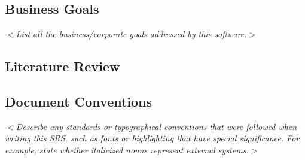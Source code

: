 \subsection{Business Goals}
\textit{$<$List all the business/corporate goals addressed by this software.$>$}
\subsection{Literature Review}
\subsection{Document Conventions}
\textit{$<$Describe any standards or typographical conventions that were followed when writing this SRS, such as fonts or highlighting that have special significance. For example, state whether italicized nouns represent external systems.$>$}